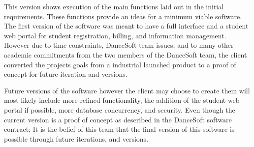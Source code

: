 This version shows execution of the main functions laid out in the initial requirements. These functions provide an ideas for a minimum viable software. The first version of the software was meant to have a full interface and a student web portal for student registration, billing, and information management. However due to time constraints, DanceSoft team issues, and to many other academic commitments from the two members of the DanceSoft team, the client converted the projects goals from a industrial launched product to a proof of concept for future iteration and versions. 

Future versions of the software however the client may choose to create them will most likely include more refined functionality, the addition of the student web portal if possible, more database concurrency, and security. Even though the current version is a proof of concept as described in the DanceSoft software contract; It is the belief of this team that the final version of this software is possible through future iterations, and versions.